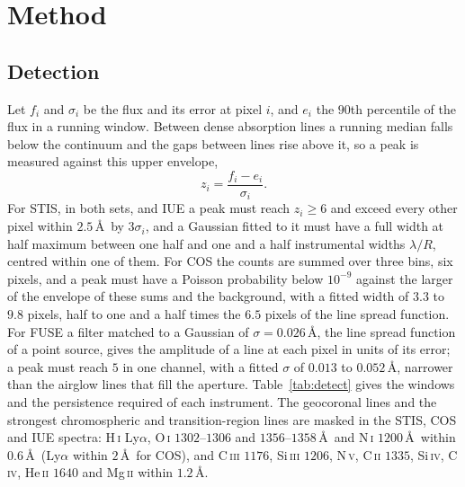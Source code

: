 \documentclass[3p,11pt]{elsarticle}
\newcommand{\ion}[2]{#1\,\textsc{#2}}
\begin{document}
\section{Method}\label{sec:method}

\subsection{Detection}

Let $f_i$ and $\sigma_i$ be the flux and its error at pixel $i$, and $e_i$ the $90$th
percentile of the flux in a running window. Between dense absorption lines a running
median falls below the continuum and the gaps between lines rise above it, so a peak is
measured against this upper envelope,
\[
z_i=\frac{f_i-e_i}{\sigma_i}.
\]
For STIS, in both sets, and IUE a peak must reach $z_i\ge6$ and exceed every other pixel within
$2.5$\,\AA\ by $3\sigma_i$, and a Gaussian fitted to it must have a full width at half
maximum between one half and one and a half instrumental widths $\lambda/R$, centred
within one of them. For COS the counts are summed over three bins, six pixels, and a
peak must have a Poisson probability below $10^{-9}$ against the larger of the envelope
of these sums and the background, with a fitted width of $3.3$ to $9.8$ pixels, half to
one and a half times the $6.5$ pixels of the line spread function. For FUSE a filter
matched to a Gaussian of $\sigma=0.026$\,\AA, the line spread function of a point
source, gives the amplitude of a line at each pixel in units of its error; a peak must
reach $5$ in one channel, with a fitted $\sigma$ of $0.013$ to $0.052$\,\AA, narrower
than the airglow lines that fill the aperture. Table~\ref{tab:detect} gives the windows
and the persistence required of each instrument. The geocoronal lines and the strongest
chromospheric and transition-region lines are masked in the STIS, COS and IUE spectra:
\ion{H}{i} Ly$\alpha$, \ion{O}{i} $1302$--$1306$ and $1356$--$1358$\,\AA\ and
\ion{N}{i} $1200$\,\AA\ within $0.6$\,\AA\ (Ly$\alpha$ within $2$\,\AA\ for COS), and
\ion{C}{iii} $1176$, \ion{Si}{iii} $1206$, \ion{N}{v}, \ion{C}{ii} $1335$,
\ion{Si}{iv}, \ion{C}{iv}, \ion{He}{ii} $1640$ and \ion{Mg}{ii} within $1.2$\,\AA.
\end{document}
